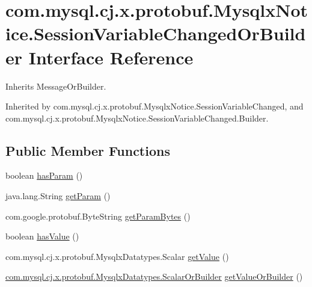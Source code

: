 \hypertarget{interfacecom_1_1mysql_1_1cj_1_1x_1_1protobuf_1_1_mysqlx_notice_1_1_session_variable_changed_or_builder}{}\section{com.\+mysql.\+cj.\+x.\+protobuf.\+Mysqlx\+Notice.\+Session\+Variable\+Changed\+Or\+Builder Interface Reference}
\label{interfacecom_1_1mysql_1_1cj_1_1x_1_1protobuf_1_1_mysqlx_notice_1_1_session_variable_changed_or_builder}


Inherits Message\+Or\+Builder.



Inherited by com.\+mysql.\+cj.\+x.\+protobuf.\+Mysqlx\+Notice.\+Session\+Variable\+Changed, and com.\+mysql.\+cj.\+x.\+protobuf.\+Mysqlx\+Notice.\+Session\+Variable\+Changed.\+Builder.

\subsection*{Public Member Functions}
\begin{DoxyCompactItemize}
\item 
boolean \mbox{\hyperlink{interfacecom_1_1mysql_1_1cj_1_1x_1_1protobuf_1_1_mysqlx_notice_1_1_session_variable_changed_or_builder_a30b8d745be399e9314a98eedfde05a6f}{has\+Param}} ()
\item 
java.\+lang.\+String \mbox{\hyperlink{interfacecom_1_1mysql_1_1cj_1_1x_1_1protobuf_1_1_mysqlx_notice_1_1_session_variable_changed_or_builder_ab4303389b7e85e5b4c10e2cd9cb92eb7}{get\+Param}} ()
\item 
com.\+google.\+protobuf.\+Byte\+String \mbox{\hyperlink{interfacecom_1_1mysql_1_1cj_1_1x_1_1protobuf_1_1_mysqlx_notice_1_1_session_variable_changed_or_builder_ad7a50397194baf96ef7f085c1f8b11bc}{get\+Param\+Bytes}} ()
\item 
boolean \mbox{\hyperlink{interfacecom_1_1mysql_1_1cj_1_1x_1_1protobuf_1_1_mysqlx_notice_1_1_session_variable_changed_or_builder_a1bd489bff2335daffc8be6bb2edf307f}{has\+Value}} ()
\item 
com.\+mysql.\+cj.\+x.\+protobuf.\+Mysqlx\+Datatypes.\+Scalar \mbox{\hyperlink{interfacecom_1_1mysql_1_1cj_1_1x_1_1protobuf_1_1_mysqlx_notice_1_1_session_variable_changed_or_builder_a7e33e3fe0131e4279db3b6fd8702fa24}{get\+Value}} ()
\item 
\mbox{\hyperlink{interfacecom_1_1mysql_1_1cj_1_1x_1_1protobuf_1_1_mysqlx_datatypes_1_1_scalar_or_builder}{com.\+mysql.\+cj.\+x.\+protobuf.\+Mysqlx\+Datatypes.\+Scalar\+Or\+Builder}} \mbox{\hyperlink{interfacecom_1_1mysql_1_1cj_1_1x_1_1protobuf_1_1_mysqlx_notice_1_1_session_variable_changed_or_builder_ad5ad02b00c71b308ec2cd515a349cf78}{get\+Value\+Or\+Builder}} ()
\end{DoxyCompactItemize}


